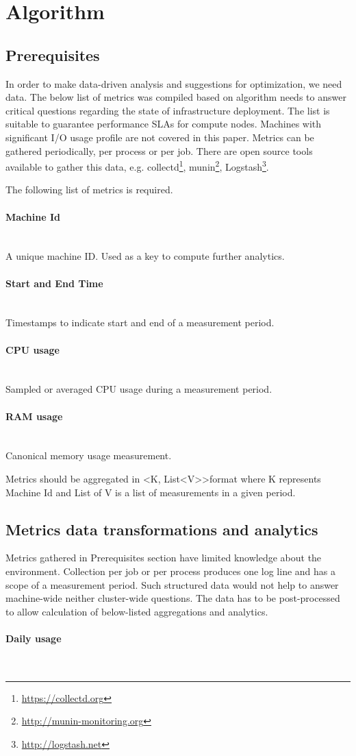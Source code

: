 \documentclass[]{final_report}
\newcommand{\myparagraph}[1]{\paragraph{#1}\mbox{}\\}
\begin{document}
\section{Algorithm}

\subsection{Prerequisites} 

In order to make data-driven analysis and suggestions for optimization, we need data. The below list of metrics was compiled based on algorithm needs to answer critical questions regarding the state of infrastructure deployment. The list is suitable to guarantee performance SLAs for compute nodes. Machines with significant I/O usage profile are not covered in this paper. 
Metrics can be gathered periodically, per process or per job. There are open source tools available to gather this data, e.g. collectd\footnote{\url{https://collectd.org}}, munin\footnote{\url{http://munin-monitoring.org}}, Logstash\footnote{\url{http://logstash.net}}.

The following list of metrics is required.
\myparagraph{Machine Id}
A unique machine ID. Used as a key to compute further analytics.

\myparagraph{Start and End Time}
Timestamps to indicate start and end of a measurement period.

\myparagraph{CPU usage}
Sampled or averaged CPU usage during a measurement period. 

\myparagraph{RAM usage}
Canonical memory usage measurement. 

Metrics should be aggregated in \textless K, List\textless V\textgreater\textgreater format where K represents Machine Id and List of V is a list of measurements in a given period. 

\subsection{Metrics data transformations and analytics}

Metrics gathered in Prerequisites section have limited knowledge about the environment. Collection per job or per process produces one log line and has a scope of a measurement period. Such structured data would not help to answer machine-wide neither cluster-wide questions. The data has to be post-processed to allow calculation of below-listed aggregations and analytics.   

\myparagraph{Daily usage}
\end{document}

